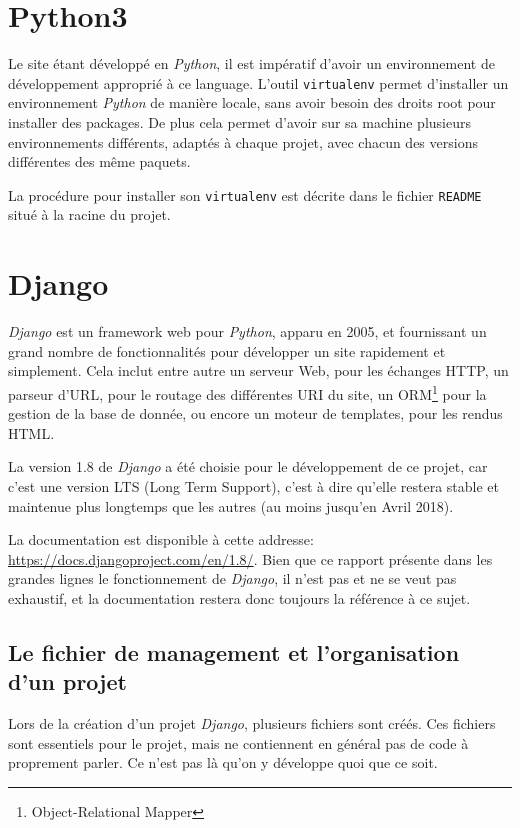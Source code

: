 \documentclass[a4paper]{report}
\begin{document}
\section{Python3}
\label{sec:python3}
\par Le site étant développé en \emph{Python}, il est impératif d'avoir un environnement de développement approprié à ce
language. L'outil \verb#virtualenv# permet d'installer un environnement \emph{Python} de manière locale, sans avoir besoin des
droits root pour installer des packages. De plus cela permet d'avoir sur sa machine plusieurs environnements différents,
adaptés à chaque projet, avec chacun des versions différentes des même paquets.
\par La procédure pour installer son \verb#virtualenv# est décrite dans le fichier \verb#README# situé à la racine du
projet.

\section{Django}
\label{sec:django}
\par \emph{Django}  est un framework web pour \emph{Python}, apparu en 2005, et fournissant un grand nombre de
fonctionnalités pour développer un site rapidement et simplement. Cela inclut entre autre un serveur Web, pour les
échanges HTTP, un parseur d'URL, pour le routage des différentes URI du site, un ORM\footnote{Object-Relational Mapper}
pour la gestion de la base de donnée, ou encore un moteur de templates, pour les rendus HTML.
\par La version 1.8 de \emph{Django} a été choisie pour le développement de ce projet, car c'est une version LTS (Long Term
Support), c'est à dire qu'elle restera stable et maintenue plus longtemps que les autres (au moins jusqu'en Avril 2018).
\par La documentation est disponible à cette addresse: \url{https://docs.djangoproject.com/en/1.8/}. Bien que ce rapport
présente dans les grandes lignes le fonctionnement de \emph{Django}, il n'est pas et ne se veut pas exhaustif, et la
documentation restera donc toujours la référence à ce sujet.

\subsection{Le fichier de management et l'organisation d'un projet}
\label{sub:Le fichier de management et l'organisation d'un projet}

\par Lors de la création d'un projet \emph{Django}, plusieurs fichiers sont créés. Ces fichiers sont essentiels pour le projet,
mais ne contiennent en général pas de code à proprement parler. Ce n'est pas là qu'on y développe quoi que ce soit.
\end{document}
